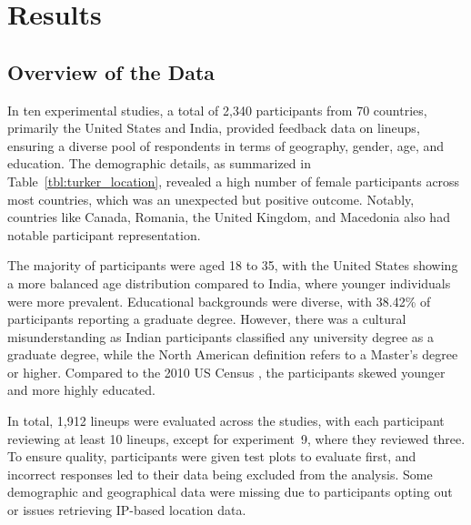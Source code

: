 \documentclass[10pt]{article}\usepackage[]{graphicx}\usepackage[]{xcolor}
\begin{document}
% 
% 
% 

\section{Results}\label{sec:result_socio}

 \subsection{Overview of the Data} In ten experimental studies, a total of 2,340 participants from 70 countries, primarily the United States and India, provided feedback data on lineups, ensuring a diverse pool of respondents in terms of geography, gender, age, and education. The demographic details, as summarized in Table~\ref{tbl:turker_location}, revealed a high number of female participants across most countries, which was an unexpected but positive outcome. Notably, countries like Canada, Romania, the United Kingdom, and Macedonia also had notable participant representation.

The majority of participants were aged 18 to 35, with the United States showing a more balanced age distribution compared to India, where younger individuals were more prevalent. Educational backgrounds were diverse, with 38.42\% of participants reporting a graduate degree. However, there was a cultural misunderstanding as Indian participants classified any university degree as a graduate degree, while the North American definition refers to a Master’s degree or higher. Compared to the 2010 US Census \cite{census}, the participants skewed younger and more highly educated.

In total, 1,912 lineups were evaluated across the studies, with each participant reviewing at least 10 lineups, except for experiment~9, where they reviewed three. To ensure quality, participants were given test plots to evaluate first, and incorrect responses led to their data being excluded from the analysis. Some demographic and geographical data were missing due to participants opting out or issues retrieving IP-based location data.
\end{document}
